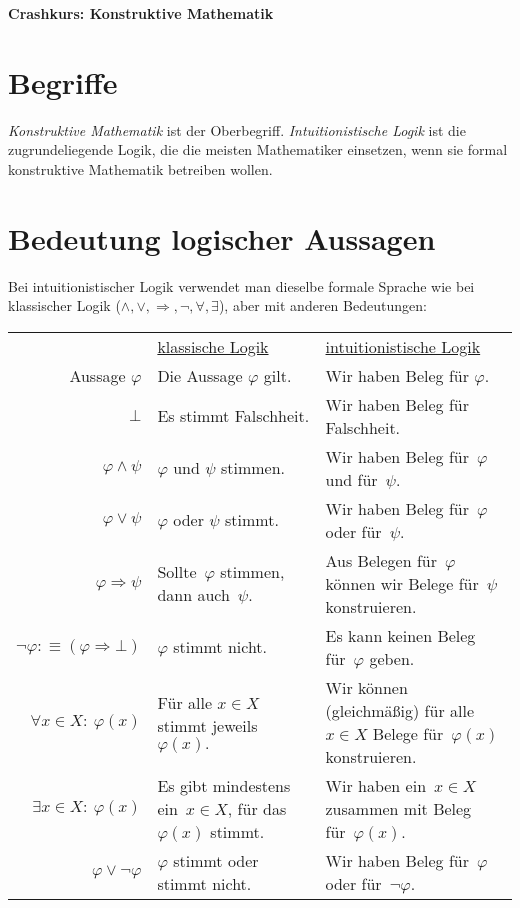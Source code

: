\documentclass{algblatt}
\theoremstyle{plain}
\begin{document}
\begin{center}\huge \textsf{\textbf{Crashkurs: Konstruktive Mathematik}}\end{center}

\section*{Begriffe}

\emph{Konstruktive Mathematik} ist der Oberbegriff. \emph{Intuitionistische
Logik} ist die zugrundeliegende Logik, die die meisten Mathematiker einsetzen,
wenn sie formal konstruktive Mathematik betreiben wollen.


\section*{Bedeutung logischer Aussagen}

Bei intuitionistischer Logik verwendet man dieselbe formale Sprache wie bei
klassischer Logik ($\wedge, \vee, \Rightarrow, \neg, \forall, \exists$), aber
mit anderen Bedeutungen:
\begin{center}
\vspace{-1em}
\setlength{\extrarowheight}{0.3em}
\begin{tabular}{@{}r@{\quad}p{6.0cm}@{\quad}p{6.6cm}}
  & \underline{klassische Logik} & \underline{intuitionistische Logik} \\[0.5em]
  Aussage $\varphi$ & Die Aussage $\varphi$ gilt. & Wir haben Beleg für $\varphi$. \\
  $\bot$ & Es stimmt Falschheit. & Wir haben Beleg für Falschheit. \\
  $\varphi \wedge \psi$ & $\varphi$ und $\psi$ stimmen. & Wir haben Beleg für~$\varphi$ und für~$\psi$. \\
  $\varphi \vee \psi$ & $\varphi$ oder $\psi$ stimmt. & Wir haben Beleg für~$\varphi$ oder für~$\psi$. \\
  $\varphi \Rightarrow \psi$ & Sollte~$\varphi$ stimmen, dann auch~$\psi$. &
  Aus Belegen für~$\varphi$ können wir Belege für~$\psi$ konstruieren. \\
  $\neg\varphi :\equiv (\varphi \Rightarrow \bot)$ &
    $\varphi$ stimmt nicht. &
    Es kann keinen Beleg für~$\varphi$ geben. \\
  $\forall x \in X{:}\ \varphi(x)$ & Für alle $x \in X$ stimmt jeweils~$\varphi(x).$ &
    Wir können (gleichmäßig) für alle~$x \in X$ Belege für~$\varphi(x)$ konstruieren. \\
  $\exists x \in X{:}\ \varphi(x)$ & \raggedright Es gibt mindestens ein~$x \in X$, für das~$\varphi(x)$
  stimmt. & {\raggedright
    Wir haben ein~$x \in X$ zusammen mit Beleg für~$\varphi(x).$} \\
  $\varphi \vee \neg\varphi$ &
    $\varphi$ stimmt oder stimmt nicht. &
    Wir haben Beleg für~$\varphi$ oder für~$\neg\varphi$.
\end{tabular}
\end{center}
\end{document}
